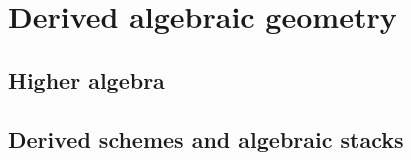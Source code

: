     \part{Derived algebraic geometry}
        \chapter{Higher algebra}
            \begin{abstract}
                
            \end{abstract}
            
            \minitoc
            
            
            
            
            
            
            
            
            
            
        
        \chapter{Derived schemes and algebraic stacks}
            \begin{abstract}
                
            \end{abstract}
            
            \minitoc
        

